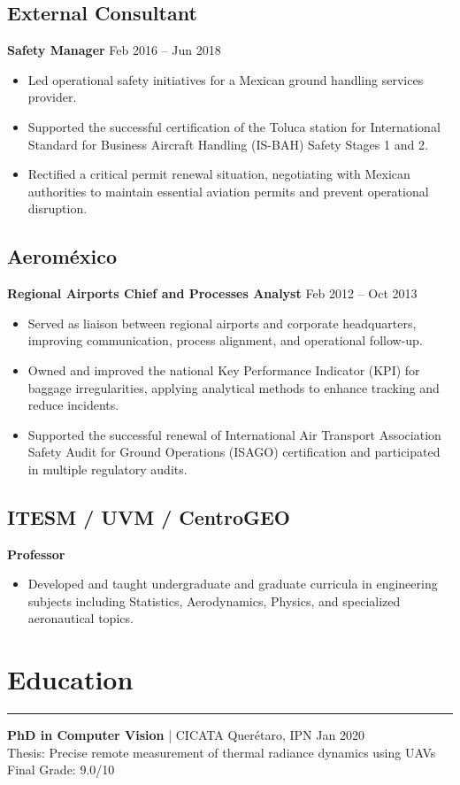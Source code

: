 \documentclass[11pt]{article}
\begin{document}
\subsection{External Consultant}
\textbf{Safety Manager} \hfill Feb 2016 -- Jun 2018
\begin{itemize}
\item Led operational safety initiatives for a Mexican ground handling services provider.
\item Supported the successful certification of the Toluca station for International Standard for Business Aircraft Handling (IS-BAH) Safety Stages 1 and 2.
\item Rectified a critical permit renewal situation, negotiating with Mexican authorities to maintain essential aviation permits and prevent operational disruption.
\end{itemize}

\subsection{Aerom\'exico}
\textbf{Regional Airports Chief and Processes Analyst} \hfill Feb 2012 -- Oct 2013
\begin{itemize}
\item Served as liaison between regional airports and corporate headquarters, improving communication, process alignment, and operational follow-up.
\item Owned and improved the national Key Performance Indicator (KPI) for baggage irregularities, applying analytical methods to enhance tracking and reduce incidents.
\item Supported the successful renewal of International Air Transport Association Safety Audit for Ground Operations (ISAGO) certification and participated in multiple regulatory audits.
\end{itemize}

\subsection{ITESM / UVM / CentroGEO}
\textbf{Professor}
\begin{itemize}
\item Developed and taught undergraduate and graduate curricula in engineering subjects including Statistics, Aerodynamics, Physics, and specialized aeronautical topics.
\end{itemize}

\section{Education}
\vspace{-10pt}
\noindent\rule{\textwidth}{0.4pt}
\textbf{PhD in Computer Vision} | CICATA Quer\'etaro, IPN \hfill Jan 2020 \\
Thesis: Precise remote measurement of thermal radiance dynamics using UAVs \\
Final Grade: 9.0/10 
\end{document}
